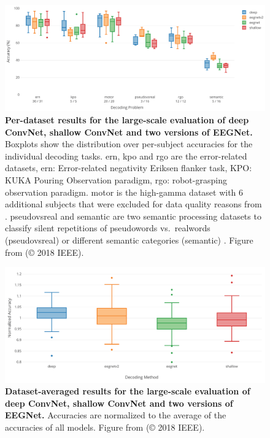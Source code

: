 \begin{figure}[htb]
    \myfloatalign
    \includegraphics[width=1\linewidth]{images/large-framework-per-dataset-results.png}
    \caption[Large-scale evaluation results]{
\textbf{Per-dataset results for the large-scale evaluation of deep
ConvNet, shallow ConvNet and two versions of EEGNet.} Boxplots show the
distribution over per-subject accuracies for the individual decoding
tasks. ern, kpo and rgo are the error-related datasets, ern:
Error-related negativity Eriksen flanker task, KPO: KUKA Pouring
Observation paradigm, rgo: robot-grasping observation paradigm. motor is
the high-gamma dataset with 6 additional subjects that were excluded for
data quality reasons from \cite{schirrmeisterdeephbm2017}.
pseudovsreal and semantic are two semantic processing datasets to
classify silent repetitions of pseudowords vs.~realwords (pseudovsreal)
or different semantic categories (semantic) . Figure from
\citet{heilmeyer2018large} (© 2018 IEEE).
}
\label{large-framework-per-dataset-results-fig}
\end{figure}


\begin{figure}[htb]
    \myfloatalign
    \includegraphics[width=1\linewidth]{images/large-framework-averaged-results.png}
    \caption[Large-scale dataset-averaged evaluation results]{
\textbf{Dataset-averaged results for the large-scale evaluation of deep
ConvNet, shallow ConvNet and two versions of EEGNet.} Accuracies are
normalized to the average of the accuracies of all models. Figure from
\citet{heilmeyer2018large} (© 2018 IEEE).
}
\label{large-framework-averaged-results-fig}
\end{figure}


